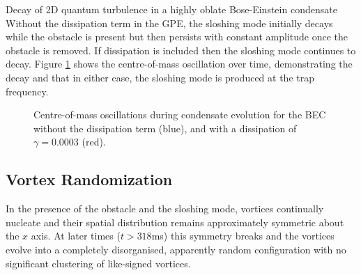 \begin{chapter}{\label{cha:shin}Decay of 2D quantum turbulence in a highly oblate Bose-Einstein condensate}
Without the dissipation term in the GPE, the sloshing mode initially decays while the obstacle is present but then persists with constant amplitude once the obstacle is removed.  If dissipation is included then the sloshing mode continues to decay. Figure \ref{fig:com_slosh} shows the centre-of-mass oscillation over time, demonstrating the decay and that in either case, the sloshing mode is produced at the trap frequency.
\begin{figure}
\begin{center}
\end{center}
\caption{\label{fig:com_slosh} Centre-of-mass oscillations during condensate evolution for the BEC without the dissipation term (blue), and with a dissipation of $\gamma = 0.0003$ (red).}
\end{figure} 

\subsection{Vortex Randomization}
In the presence of the obstacle and the sloshing mode,
vortices continually nucleate and their spatial distribution remains
approximately symmetric about the $x$ axis.  
At later times ($t>318$ms) this symmetry breaks and the vortices 
evolve into a completely disorganised, apparently random 
configuration with no significant clustering of like-signed vortices.  


\end{chapter}
